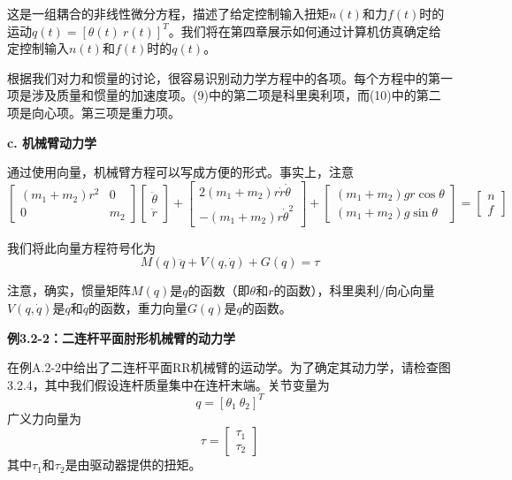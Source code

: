 \documentclass[12pt,a4paper]{ctexart}
\begin{document}
这是一组耦合的非线性微分方程，描述了给定控制输入扭矩$n(t)$和力$f(t)$时的运动$q(t) = [\theta(t) \ r(t)]^T$。我们将在第四章展示如何通过计算机仿真确定给定控制输入$n(t)$和$f(t)$时的$q(t)$。

根据我们对力和惯量的讨论，很容易识别动力学方程中的各项。每个方程中的第一项是涉及质量和惯量的加速度项。(9)中的第二项是科里奥利项，而(10)中的第二项是向心项。第三项是重力项。

\textbf{c. 机械臂动力学}

通过使用向量，机械臂方程可以写成方便的形式。事实上，注意
\begin{equation}
\begin{bmatrix} (m_1+m_2)r^2 & 0 \\ 0 & m_2 \end{bmatrix} \begin{bmatrix} \ddot{\theta} \\ \ddot{r} \end{bmatrix} + \begin{bmatrix} 2(m_1+m_2)r\dot{r}\dot{\theta} \\ -(m_1+m_2)r\dot{\theta}^2 \end{bmatrix} + \begin{bmatrix} (m_1+m_2)gr\cos\theta \\ (m_1+m_2)g\sin\theta \end{bmatrix} = \begin{bmatrix} n \\ f \end{bmatrix}
\end{equation}

我们将此向量方程符号化为
\begin{equation}
M(q)\ddot{q} + V(q,\dot{q}) + G(q) = \tau
\end{equation}

注意，确实，惯量矩阵$M(q)$是$q$的函数（即$\theta$和$r$的函数），科里奥利/向心向量$V(q,\dot{q})$是$q$和$\dot{q}$的函数，重力向量$G(q)$是$q$的函数。

\textbf{例3.2-2：二连杆平面肘形机械臂的动力学}

在例A.2-2中给出了二连杆平面RR机械臂的运动学。为了确定其动力学，请检查图3.2.4，其中我们假设连杆质量集中在连杆末端。关节变量为
\begin{equation}
q = [\theta_1 \ \theta_2]^T
\end{equation}
广义力向量为
\begin{equation}
\tau = \begin{bmatrix} \tau_1 \\ \tau_2 \end{bmatrix}
\end{equation}
其中$\tau_1$和$\tau_2$是由驱动器提供的扭矩。
\end{document}
